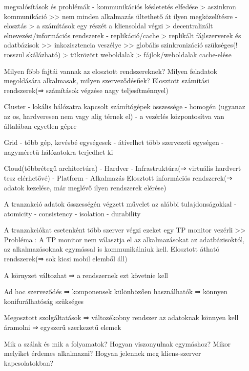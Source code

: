 \documentclass[12pt]{article}
\begin{document}
\begin{description}
    \item megvalósítások és problémák 
        - kommunikációs késletetés elfedése 
        > aszinkron kommunikáció >> nem minden alkalmazás ültethető át ilyen megközelítésre
        - elosztás 
        > a számítások egy részét a kliensoldal végzi
        > decentralizált elnevezési/információs rendszerek
        - replikáció/cache
        > replikált fájlszerverek és adatbázisok >> inkozisztencia veszélye >> globális szinkronizáció szükséges(! rosszul skálázható)
        > tükrözött weboldalak
        > fájlok/weboldalak cache-elése
    \item  Milyen főbb fajtái vannak az elosztott rendszereknek? Milyen feladatok megoldására alkalmasak, milyen szerveződésűek?
        Elosztott számítási rendszerek(⇒ számítások végzése nagy teljesítménnyel)
    \item Cluster
        - lokális hálózatra kapcsolt számítógépek összessége 
        - homogén (ugyanaz az os, hardveresen nem vagy alig térnek el)
        - a vezérlés központosítva van általában egyetlen gépre
    \item Grid
        - több gép, kevésbé egységesek
        - átívelhet több szervezeti egységen 
        - nagyméretű hálózatokra terjedhet ki 
    \item Cloud(többrétegű architectúra)
        - Hardver
        - Infrastruktúra(⇒ virtuális hardvert tesz elérhetővé)
        - Platform
        - Alkalmazás
        Elosztott információs rendszerek(⇒  adatok kezelése, már meglévő ilyen rendszerek elérése)
    \item A tranzakció adatok összességén végzett művelet az alábbi tulajdonságokkal
        - atomicity
        - consistency
        - isolation
        - durability
    \item A tranzakciókat esetenként több szerver végzi ezeket egy TP monitor vezérli 
        >> Probléma :  A TP monitor nem választja el az alkalmazásokat az adatbázisoktól,  az alkalmazásoknak egymással is kommunikálniuk kell.
        Elosztott átható rendszerek(⇒ sok kicsi mobil elemből áll)
    \item A környzet változhat ⇒ a rendszernek ezt követnie kell
    \item Ad hoc szerveződés ⇒ komponensek különbözően használhatók ⇒ könnyen konifurálhatóság szükséges
    \item Megosztott szolgáltatások ⇒ változékobny rendszer az adatoknak könnyen kell áramolni ⇒ egyszerű szerkezetű elemek
    \item  Mik a szálak és mik a folyamatok? Hogyan viszonyulnak egymáshoz? Mikor melyiket érdemes alkalmazni? Hogyan jelennek meg kliens-szerver kapcsolatokban?	

\end{description}
\end{document}

